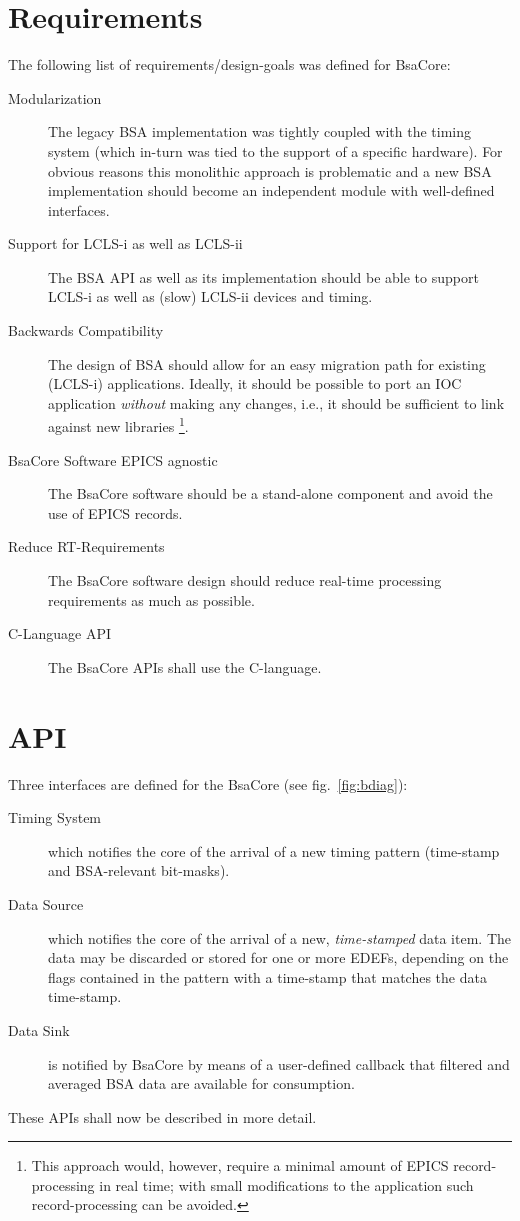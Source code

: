 \documentclass[11pt]{article}
\newcommand{\bsac}{BsaCore}
\newcommand{\bsa} {BSA}
\newcommand{\EDEF}{EDEF}
\begin{document}
\section{Requirements}
The following list of requirements/design-goals was defined for \bsac:
\begin{description}
\item[Modularization] The legacy \bsa{} implementation was tightly coupled with the timing
   system (which in-turn was tied to the support of a specific hardware). For obvious reasons
   this monolithic approach is problematic and a new \bsa{} implementation should become an
   independent module with well-defined interfaces.
\item[Support for LCLS-i as well as LCLS-ii] The \bsa{} API as well as its implementation should
   be able to support LCLS-i as well as (slow) LCLS-ii devices and timing.
\item[Backwards Compatibility] The design of \bsa{} should allow for an easy migration path for
   existing (LCLS-i) applications. Ideally, it should be possible to port an IOC application 
   {\em without} making any changes, i.e., it should be sufficient to link against new libraries%
\footnote{This approach would, however, require a minimal amount of EPICS record-processing in real
time; with small modifications to the application such record-processing can be avoided.}.
\item[\bsac{} Software EPICS agnostic] The \bsac{} software should be a stand-alone component and
   avoid the use of EPICS records.
\item[Reduce RT-Requirements] The \bsac{} software design should reduce real-time processing
   requirements as much as possible.
\item[C-Language API] The \bsac{} APIs shall use the C-language.
\end{description}

\section{API}
Three interfaces are defined for the \bsac{} (see fig.~\ref{fig:bdiag}):
\begin{description}
\item[Timing System] which notifies the core of the arrival of a new timing pattern (time-stamp and
     \bsa{}-relevant bit-masks).
\item[Data Source] which notifies the core of the arrival of a new, {\em time-stamped} data item.
     The data may be discarded or stored for one or more \EDEF{}s, depending on the flags contained
     in the pattern with a time-stamp that matches the data time-stamp.
\item[Data Sink] is notified by \bsac{} by means of a user-defined callback that filtered and averaged
     \bsa{} data are available for consumption.
\end{description}
These APIs shall now be described in more detail.
\end{document}
